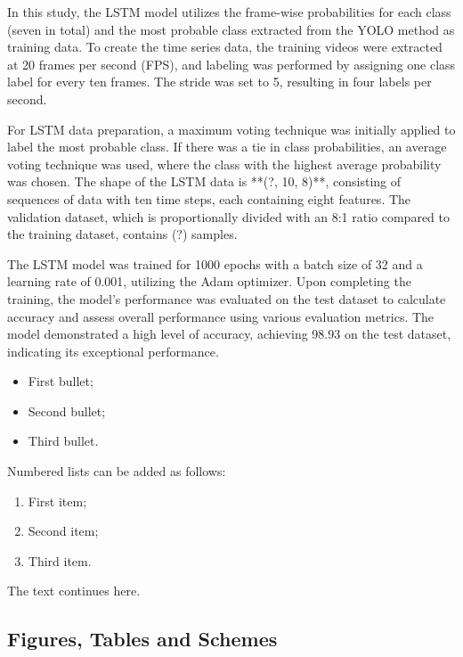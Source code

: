 \documentclass[journal,article,submit,pdftex,moreauthors]{Definitions/mdpi}
\begin{document}
In this study, the LSTM model utilizes the frame-wise probabilities for each class (seven in total) and the most probable class extracted from the YOLO method as training data. To create the time series data, the training videos were extracted at 20 frames per second (FPS), and labeling was performed by assigning one class label for every ten frames. The stride was set to 5, resulting in four labels per second.

For LSTM data preparation, a maximum voting technique was initially applied to label the most probable class. If there was a tie in class probabilities, an average voting technique was used, where the class with the highest average probability was chosen. The shape of the LSTM data is **(?, 10, 8)**, consisting of sequences of data with ten time steps, each containing eight features. The validation dataset, which is proportionally divided with an 8:1 ratio compared to the training dataset, contains (?) samples.

The LSTM model was trained for 1000 epochs with a batch size of 32 and a learning rate of 0.001, utilizing the Adam optimizer. Upon completing the training, the model's performance was evaluated on the test dataset to calculate accuracy and assess overall performance using various evaluation metrics. The model demonstrated a high level of accuracy, achieving 98.93 on the test dataset, indicating its exceptional performance.








\begin{itemize}
\item	First bullet;
\item	Second bullet;
\item	Third bullet.
\end{itemize}

Numbered lists can be added as follows:
\begin{enumerate}
\item	First item; 
\item	Second item;
\item	Third item.
\end{enumerate}

The text continues here. 

\subsection{Figures, Tables and Schemes}
\end{document}
